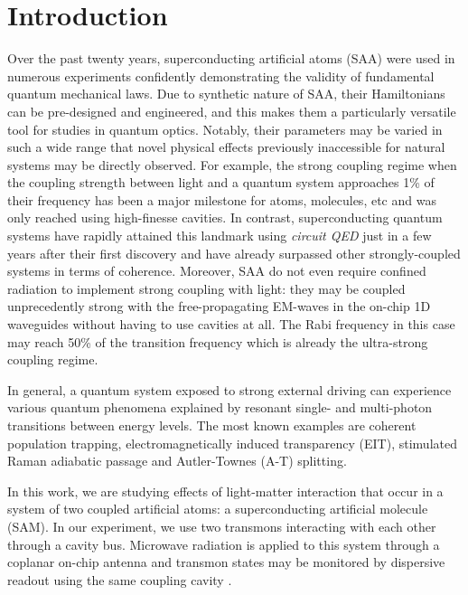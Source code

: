 \documentclass[%
 aip,
 amsmath,amssymb,
 reprint,%
]{revtex4-1}
\begin{document}
\section{Introduction}
Over the past twenty years, superconducting artificial atoms (SAA) were used in numerous experiments confidently demonstrating the validity of fundamental quantum mechanical laws\cite{you2011atomic}. Due to synthetic nature of SAA, their Hamiltonians can be pre-designed and engineered, and this makes them a particularly versatile tool for studies in quantum optics. Notably, their parameters may be varied in such a wide range that novel physical effects previously inaccessible for natural systems may be directly observed. For example, the strong coupling regime when the coupling strength between light and a quantum system approaches 1\% of their frequency has been a major milestone for atoms, molecules, etc and was only reached using high-finesse cavities. In contrast, superconducting quantum systems have rapidly attained this landmark using \textit{circuit QED}\cite{wallraff2004strong} just in a few years after their first discovery\cite{chiorescu2004coherent} and have already surpassed other strongly-coupled systems in terms of coherence\cite{forn2019ultrastrong}. 
Moreover, SAA do not even require confined radiation to implement strong coupling with light: they may be coupled unprecedently strong with the free-propagating EM-waves in the on-chip 1D waveguides\cite{astafiev2010resonance} without having to use cavities at all. The Rabi frequency in this case may reach 50\% of the transition frequency\cite{deng2015observation} which is already the ultra-strong coupling regime.

In general, a quantum system exposed to strong external driving can experience various quantum phenomena explained by resonant single- and multi-photon transitions between energy levels. The most known examples are coherent population trapping, electromagnetically induced transparency (EIT)\cite{boller1991observation}, stimulated Raman adiabatic passage\cite{bergmann1998coherent} and Autler-Townes (A-T) splitting\cite{autler1955stark}. 

In this work, we are studying effects of light-matter interaction that occur in a system of two coupled artificial atoms: a superconducting artificial molecule (SAM). In our experiment, we use two transmons\cite{koch2007charge} interacting with each other through a cavity bus\cite{majer2007coupling}. Microwave radiation is applied to this system through a coplanar on-chip antenna and transmon states may be monitored by dispersive readout using the same coupling cavity \cite{chow2010detecting}.
\end{document}

